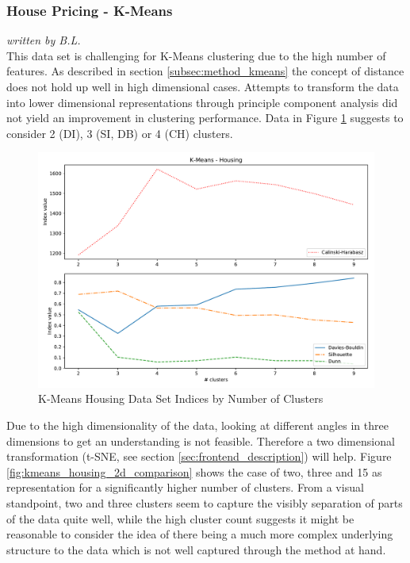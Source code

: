 \subsubsection{House Pricing - K-Means}
\textit{written by B.L.}\\

This data set is challenging for K-Means clustering due to the high number of features. As described in section \ref{subsec:method_kmeans} the concept of distance does not hold up well in high dimensional cases. Attempts to transform the data into lower dimensional representations through principle component analysis did not yield an improvement in clustering performance. Data in Figure \ref{fig:kmeans_housing_indices_plot} suggests to consider 2 (\gls{DI}), 3 (\gls{SI}, \gls{DB}) or 4 (\gls{CH}) clusters.

\begin{figure}[H]
\begin{center}
\includegraphics[width=1.0\textwidth]{images/kmeans_housing_index_plot.pdf}
\end{center}
\caption{K-Means Housing Data Set Indices by Number of Clusters}
\label{fig:kmeans_housing_indices_plot}
\end{figure}

Due to the high dimensionality of the data, looking at different angles in three dimensions to get an understanding is not feasible. Therefore a two dimensional transformation (t-SNE, see section \ref{sec:frontend_description}) will help. Figure \ref{fig:kmeans_housing_2d_comparison} shows the case of two, three and 15 as representation for a significantly higher number of clusters. From a visual standpoint, two and three clusters seem to capture the visibly separation of parts of the data quite well, while the high cluster count suggests it might be reasonable to consider the idea of there being a much more complex underlying structure to the data which is not well captured through the method at hand.

